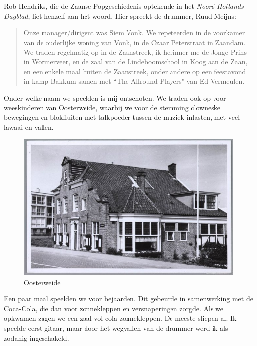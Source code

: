 \documentclass[10pt,twoside, openright]{memoir}
\begin{document}
Rob Hendriks, die de Zaanse Popgeschiedenis optekende in het \emph{Noord Hollands Dagblad}, liet henzelf aan het woord. Hier spreekt de drummer, Ruud Meijns: 

\begin{quote}
Onze manager/dirigent was Siem Vonk. We repeteerden in de voorkamer van de ouderlijke woning van Vonk, in de Czaar Peterstraat in Zaandam. We traden regelmatig op in de Zaanstreek, ik herinner me de Jonge Prins in Wormerveer, en de zaal van de Lindeboomschool in Koog aan de Zaan, en een enkele maal buiten de Zaanstreek, onder andere op een feestavond in kamp Bakkum samen met ``The Allround Players" van Ed Vermeulen.
\end{quote}

Onder welke naam we speelden is mij ontschoten. We traden ook op voor weeskinderen van Oosterweide, waarbij we voor de stemming clowneske bewegingen en blokfluiten met talkpoeder tussen de muziek inlasten, met veel lawaai en vallen. 

\begin{figure}
\includegraphics[width=\textwidth]{img/134 Oosterweide}
\caption*{\footnotesize Oosterweide}
\end{figure}

Een paar maal speelden we voor bejaarden. Dit gebeurde in samenwerking met de Coca-Cola, die dan voor zonnekleppen en versnaperingen zorgde. Als we opkwamen zagen we een zaal vol cola-zonnekleppen. De meeste sliepen al. Ik speelde eerst gitaar, maar door het wegvallen van de drummer werd ik als zodanig ingeschakeld. 
\end{document}

